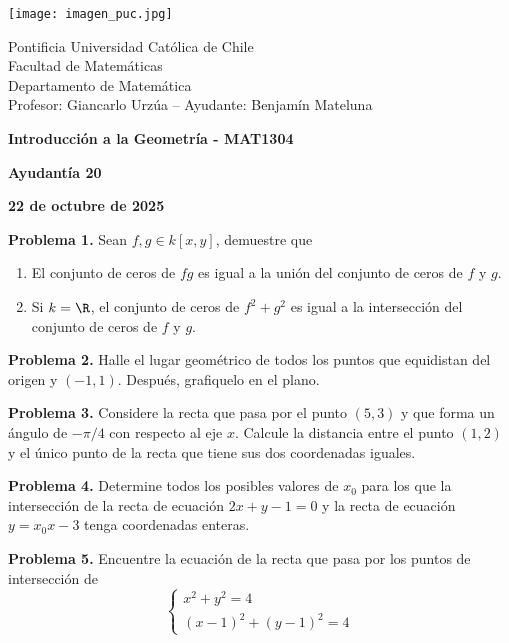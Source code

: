 \documentclass{article}
\begin{document}
\begin{minipage}{2.5cm}
    \texttt{[image: imagen\_puc.jpg]}
\end{minipage}
\begin{minipage}{14cm}
    {\sc Pontificia Universidad Católica de Chile\\
    Facultad de Matemáticas\\
    Departamento de Matemática\\
    Profesor: Giancarlo Urzúa -- Ayudante: Benjamín Mateluna}
\end{minipage}
\vspace{1ex}

{\centerline{\bf Introducción a la Geometría - MAT1304}
\centerline{\bf Ayudantía 20}}
\centerline{\bf 22 de octubre de 2025}

\vspace{1cm}
\noindent\textbf{Problema 1.} Sean $f,g\in k[x,y]$, demuestre que
\begin{enumerate}
    \item El conjunto de ceros de $fg$ es igual a la unión del conjunto de ceros de $f$ y $g$.
    \item Si $k=\R$, el conjunto de ceros de $f^{2}+g^{2}$ es igual a la intersección del conjunto 
    de ceros de $f$ y $g$.
\end{enumerate}

\vspace{5mm}
\noindent\textbf{Problema 2.} Halle el lugar geométrico de todos los puntos que equidistan del
origen y $(-1,1)$. Después, grafiquelo en el plano.

\vspace{5mm}
\noindent\textbf{Problema 3.} Considere la recta que pasa por el punto $(5,3)$ y que forma un
ángulo de $-\pi/4$ con respecto al eje $x$. Calcule la distancia entre el punto $(1,2)$ y
el único punto de la recta que tiene sus dos coordenadas iguales.

\vspace{5mm}
\noindent\textbf{Problema 4.} Determine todos los posibles valores de $x_{0}$ para los que la
intersección de la recta de ecuación $2x+y-1=0$ y la recta de ecuación $y=x_{0}x-3$ tenga 
coordenadas enteras.

\vspace{5mm}
\noindent\textbf{Problema 5.} Encuentre la ecuación de la recta que pasa por los puntos de 
intersección de
\begin{equation*}
    \begin{cases}
        x^{2}+y^{2}=4 \\
        (x-1)^{2}+(y-1)^{2}=4
    \end{cases}
\end{equation*}

\end{document}
